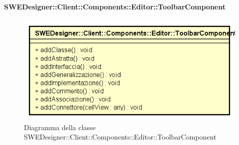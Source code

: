 			\paragraph{SWEDesigner::Client::Components::Editor::ToolbarComponent}
			\begin{figure}[h!]
			\centering
			\includegraphics[scale=0.8]{Classi/SWEDesigner__Client__Components__Editor__ToolbarComponent.png}
			\caption{Diagramma della classe SWEDesigner::Client::Components::Editor::ToolbarComponent}
 			\end{figure}
